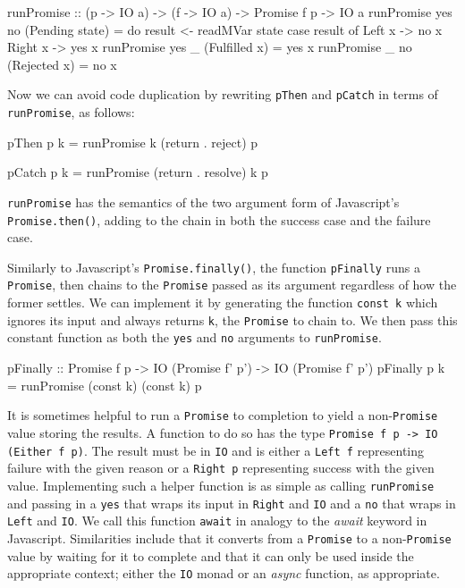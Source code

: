 \documentclass[12pt, english, letterpaper]{kuthesis}
\newcommand{\lit}[1]{\texttt{#1}}
\begin{document}
\begin{code}
runPromise :: (p -> IO a) -> (f -> IO a) -> Promise f p -> IO a
runPromise yes no (Pending state) = do
  result <- readMVar state
  case result of
    Left x -> no x
    Right x -> yes x
runPromise yes _ (Fulfilled x) = yes x
runPromise _ no (Rejected x) = no x

\end{code}
Now we can avoid code duplication by rewriting \lit{pThen} and \lit{pCatch} in terms of \lit{runPromise}, as follows:

\begin{code}
pThen p k = runPromise k (return . reject) p

pCatch p k = runPromise (return . resolve) k p  
\end{code}
\lit{runPromise} has the semantics of the two argument form of Javascript's \lit{Promise.then()}, adding to the chain in both the success case and the failure case. 

Similarly to Javascript's \lit{Promise.finally()}, the function \lit{pFinally} runs a \lit{Promise}, then chains to the \lit{Promise} passed as its argument regardless of how the former settles.  We can implement it by generating the function \lit{const k} which ignores its input and always returns \lit{k}, the \lit{Promise} to chain to.  We then pass this constant function as both the \lit{yes} and \lit{no} arguments to \lit{runPromise}.

\begin{code}
pFinally :: Promise f p
         -> IO (Promise f' p')
         -> IO (Promise f' p')
pFinally p k = runPromise (const k) (const k) p
\end{code}

It is sometimes helpful to run a \lit{Promise} to completion to yield a non-\lit{Promise} value storing the results.  A function to do so has the type \lit{Promise f p -> IO (Either f p)}.  The result must be in \lit{IO} and is either a \lit{Left f} representing failure with the given reason or a \lit{Right p} representing success with the given value.  Implementing such a helper function is as simple as calling \lit{runPromise} and passing in a \lit{yes} that wraps its input in \lit{Right} and \lit{IO} and a \lit{no} that wraps in \lit{Left} and \lit{IO}.  We call this function \lit{await} in analogy to the \emph{await} keyword in Javascript.  Similarities include that it converts from a \lit{Promise} to a non-\lit{Promise} value by waiting for it to complete and that it can only be used inside the appropriate context; either the \lit{IO} monad or an \emph{async} function, as appropriate.
\end{document}
